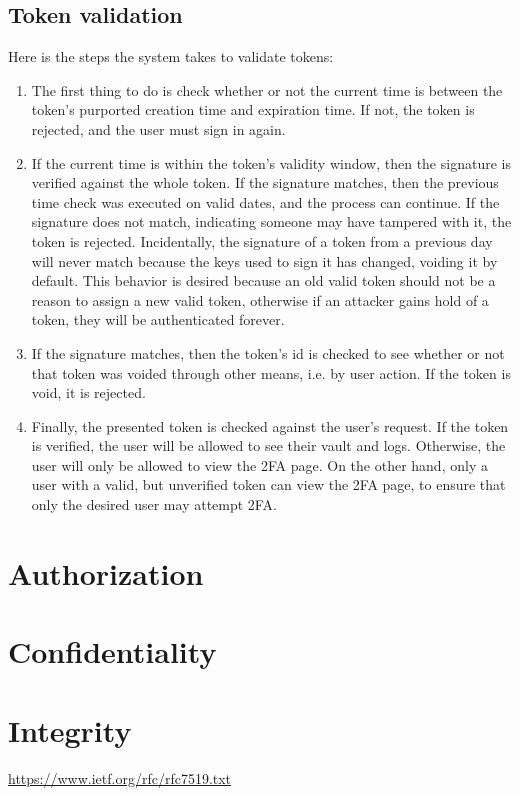 \documentclass{article}
\begin{document}
\subsection{Token validation}
\label{sub:token_validation}
\par Here is the steps the system takes to validate tokens:
\begin{enumerate}[1.]
  \item The first thing to do is check whether or not the current time is between the token's purported creation time and expiration time. If not, the token is rejected, and the user must sign in again.
  \item If the current time is within the token's validity window, then the signature is verified against the whole token. If the signature matches, then the previous time check was executed on valid dates, and the process can continue. If the signature does not match, indicating someone may have tampered with it, the token is rejected. Incidentally, the signature of a token from a previous day will never match because the keys used to sign it has changed, voiding it by default. This behavior is desired because an old valid token should not be a reason to assign a new valid token, otherwise if an attacker gains hold of a token, they will be authenticated forever.
  \item If the signature matches, then the token's id is checked to see whether or not that token was voided through other means, i.e. by user action. If the token is void, it is rejected.
  \item Finally, the presented token is checked against the user's request. If the token is verified, the user will be allowed to see their vault and logs. Otherwise, the user will only be allowed to view the 2FA page. On the other hand, only a user with a valid, but unverified token can view the 2FA page, to ensure that only the desired user may attempt 2FA.
\end{enumerate}

\section{Authorization}
\section{Confidentiality}
\section{Integrity}

\begin{thebibliography}{30}
    \url{https://www.ietf.org/rfc/rfc7519.txt}
\end{thebibliography}
\end{document}
